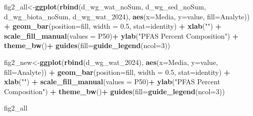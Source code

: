 \documentclass[
]{article}
\newenvironment{Shaded}{\begin{snugshade}}{\end{snugshade}}
\newcommand{\AttributeTok}[1]{\textcolor[rgb]{0.13,0.29,0.53}{#1}}
\newcommand{\DecValTok}[1]{\textcolor[rgb]{0.00,0.00,0.81}{#1}}
\newcommand{\FloatTok}[1]{\textcolor[rgb]{0.00,0.00,0.81}{#1}}
\newcommand{\FunctionTok}[1]{\textcolor[rgb]{0.13,0.29,0.53}{\textbf{#1}}}
\newcommand{\NormalTok}[1]{#1}
\newcommand{\OtherTok}[1]{\textcolor[rgb]{0.56,0.35,0.01}{#1}}
\newcommand{\SpecialCharTok}[1]{\textcolor[rgb]{0.81,0.36,0.00}{\textbf{#1}}}
\newcommand{\StringTok}[1]{\textcolor[rgb]{0.31,0.60,0.02}{#1}}
\begin{document}
\begin{Shaded}
\begin{Highlighting}[]
\NormalTok{fig2\_all}\OtherTok{\textless{}{-}}\FunctionTok{ggplot}\NormalTok{(}\FunctionTok{rbind}\NormalTok{(d\_wg\_wat\_noSum,}
\NormalTok{                       d\_wg\_sed\_noSum,}
\NormalTok{                       d\_wg\_biota\_noSum,}
\NormalTok{                       d\_wg\_wat\_2024),}
       \FunctionTok{aes}\NormalTok{(}\AttributeTok{x=}\NormalTok{Media, }\AttributeTok{y=}\NormalTok{value, }\AttributeTok{fill=}\NormalTok{Analyte)) }\SpecialCharTok{+} 
  \FunctionTok{geom\_bar}\NormalTok{(}\AttributeTok{position=}\StringTok{\textquotesingle{}fill\textquotesingle{}}\NormalTok{, }\AttributeTok{width =} \FloatTok{0.5}\NormalTok{, }\AttributeTok{stat=}\StringTok{\textquotesingle{}identity\textquotesingle{}}\NormalTok{) }\SpecialCharTok{+}
  \FunctionTok{xlab}\NormalTok{(}\StringTok{""}\NormalTok{) }\SpecialCharTok{+}
  \FunctionTok{scale\_fill\_manual}\NormalTok{(}\AttributeTok{values =}\NormalTok{ P50)}\SpecialCharTok{+}
  \FunctionTok{ylab}\NormalTok{(}\StringTok{"PFAS Percent Composition"}\NormalTok{) }\SpecialCharTok{+}
  \FunctionTok{theme\_bw}\NormalTok{()}\SpecialCharTok{+}
  \FunctionTok{guides}\NormalTok{(}\AttributeTok{fill=}\FunctionTok{guide\_legend}\NormalTok{(}\AttributeTok{ncol=}\DecValTok{3}\NormalTok{))}


\NormalTok{fig2\_new}\OtherTok{\textless{}{-}}\FunctionTok{ggplot}\NormalTok{(}\FunctionTok{rbind}\NormalTok{(d\_wg\_wat\_2024),}
       \FunctionTok{aes}\NormalTok{(}\AttributeTok{x=}\NormalTok{Media, }\AttributeTok{y=}\NormalTok{value, }\AttributeTok{fill=}\NormalTok{Analyte)) }\SpecialCharTok{+} 
  \FunctionTok{geom\_bar}\NormalTok{(}\AttributeTok{position=}\StringTok{\textquotesingle{}fill\textquotesingle{}}\NormalTok{, }\AttributeTok{width =} \FloatTok{0.5}\NormalTok{, }\AttributeTok{stat=}\StringTok{\textquotesingle{}identity\textquotesingle{}}\NormalTok{) }\SpecialCharTok{+}
  \FunctionTok{xlab}\NormalTok{(}\StringTok{""}\NormalTok{) }\SpecialCharTok{+}
  \FunctionTok{scale\_fill\_manual}\NormalTok{(}\AttributeTok{values =}\NormalTok{ P50)}\SpecialCharTok{+}
  \FunctionTok{ylab}\NormalTok{(}\StringTok{"PFAS Percent Composition"}\NormalTok{) }\SpecialCharTok{+}
  \FunctionTok{theme\_bw}\NormalTok{()}\SpecialCharTok{+}
  \FunctionTok{guides}\NormalTok{(}\AttributeTok{fill=}\FunctionTok{guide\_legend}\NormalTok{(}\AttributeTok{ncol=}\DecValTok{3}\NormalTok{))}


\NormalTok{fig2\_all}
\end{Highlighting}
\end{Shaded}
\end{document}
